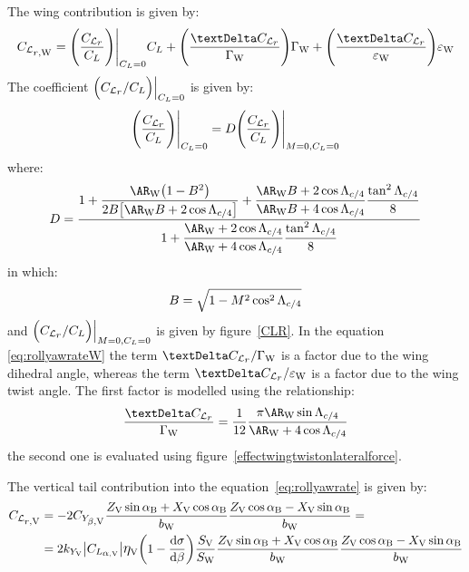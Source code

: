 The wing contribution is given by:
\begin{equation}
\label{eq:rollyawrateW}
\CLrrateW = \Biggl( \frac{\CLrrate}{\CLift} \Biggr) \Bigg|_{\CLift = 0} \CLift + \Biggl( \frac{\textrm \textDelta\CLrrate}{\GammaW} \Biggr) \GammaW + \Biggl( \frac{\textrm \textDelta\CLrrate}{\epsW} \Biggr) \epsW
\end{equation}
The coefficient $\Bigl( {\CLrrate}/{\CLift} \Bigr) \Big|_{\CLift = 0}$ is given by:
\begin{equation}
\Biggl( \frac{\CLrrate}{\CLift} \Biggr) \Bigg|_{\CLift = 0} = D \Biggl( \frac{\CLrrate}{\CLift} \Biggr) \Bigg|_{M = 0, \CLift = 0}
\end{equation}
where:
\begin{equation}
D = \frac{1 + \dfrac{\ARW \bigl (1 - B^2 \bigr )}{2B \bigl [\ARW B + 2\cos\LambdaQC \bigr ]} + \dfrac{\ARW B + 2\cos\LambdaQC}{\ARW B + 4\cos\LambdaQC} \dfrac{\tan^2\LambdaQC}{8}}{1 + \dfrac{\ARW + 2\cos\LambdaQC}{\ARW + 4\cos\LambdaQC}\dfrac{\tan^2\LambdaQC}{8}}
\end{equation}
in which:
\begin{equation}
B = \sqrt{1 - M^2 \cos^2\Lambda_{c/4}}
\end{equation}
and $\Bigl( {\CLrrate}/{\CLift} \Bigr) \Big|_{M = 0, \CLift = 0}$ is given by figure~\vref{CLR}. In the equation \ref{eq:rollyawrateW} the term ${\textrm \textDelta\CLrrate}/{\GammaW}$ is a factor due to the wing dihedral angle, whereas the term ${\textrm \textDelta\CLrrate}/{\epsW}$ is a factor due to the wing twist angle. The first factor is modelled using the relationship:
\begin{equation}
\frac{\textrm \textDelta\CLrrate}{\GammaW} = \frac{1}{12} \frac{\pi \ARW \sin\LambdaQC}{\ARW + 4\cos\LambdaQC}
\end{equation}
the second one is evaluated using figure~\vref{effectwingtwistonlateralforce}.

The vertical tail contribution into the equation~\ref{eq:rollyawrate} is given by:
\begin{equation}
\label{eq:rollyawrateV}
\begin{split}
\CLrrateV & = - 2 \CYbetaV \frac{\ZV \sin\alphaB + \XV\cos\alphaB}{\bW} \frac{\ZV \cos\alphaB - \XV\sin\alphaB}{\bW} = \\
& = 2 k_{Y_\textrm V} \big|\CLalphaV \big| \etaV \biggl( 1 - \frac{\mathrm{d}\sigma}{\mathrm{d}\beta} \biggr) \frac{\SV}{\SW} \frac{\ZV \sin\alphaB + \XV\cos\alphaB}{\bW} \frac{\ZV \cos\alphaB - \XV\sin\alphaB}{\bW}
\end{split}
\end{equation}

